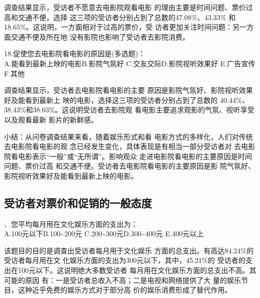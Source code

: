 \documentclass[12pt,twoside]{article}
\newcommand{\heiti}{\CJKfamily{heiti}\enhei}
\begin{document}
\par 调查结果显示，受访者不愿意去电影院观看电影
的理由主要是时间问题、票价过高和交通不便，选择
这三项的受访者分别占到了总数的47.08\%、43.33\%
和18.65\%。这说明，一方面相对于过高的票价，受
访者更加关注时间问题：另一方面交通不便及所在地
没有影院也影响了受访者去影院消费。

\par\noindent 18.促使您去电影院看电影的原因是(多选题)：\\
A.能看到最新上映的电影\tabskips B.影院气氛好\tabskips
C.交友交际\tabskips  D.影院视听效果好\tabskips
E.广告宣传\tabskips  F.其他

\par 调查结果显示，受访者去电影院看电影的主要
原因是影院气氛好、影院视听效果好及能看到最新上
映的电影，选择这三项的受访者分别占到了总数的
40.44\%、38.43\%和38.03\%。这说明受访者去影院观
看电影主要追求观影的气氛、视听享受以及观看最新
影片的新鲜感。
\par {\heiti
小结：从问卷调查结果来看，随着娱乐形式和看
电影方式的多样化，人们对传统去电影院看电影的观
念已经发生变化，具体表现是有相当一部分受访者对
去电影院看电影表示“一般”或“无所谓”。影响观众
走进电影院看电影的主要原因是时间问题、票价过高
和交通不便。受访者去电影院看电影的主要原因是影
院气氛好、影院视听效果好及能看到最新上映的电影。
}
\subsection{受访者对票价和促销的一般态度}
\par{}．您平均每月用在文化娱乐方面的支出为：\\
A.100元以下\tabskips B.100\textasciitilde200元\tabskips
C.200\textasciitilde 300元\tabskips D.300\textasciitilde400元\tabskips
E.400元以上
\par 该题目的目的是调查出受访者每月用于文化娱乐
方面的总支出。有高达84.24\%的受访者每月用在文
化娱乐方面的支出为300元以下，其中，45.21\%的
受访者的支出在100元以下。这说明绝大多数受访者
每月用在文化娱乐方面的总支出不高。其可能的原因
有：一是受访者总收入不高；二是电视和网络提供了大
量的娱乐节目，这种近乎免费的娱乐方式对于部分高
价的娱乐消费形成了替代作用。
\end{document}
